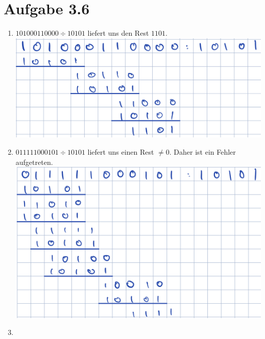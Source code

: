\documentclass[12pt, a4paper]{article}
\begin{document}
\newpage

\section*{Aufgabe 3.6}
\begin{enumerate}[label=\alph*)]
	\item	$101000110000 \div 10101$ liefert uns den Rest $1101$.\\
			\includegraphics[scale=0.6]{3.6_a.png}
	
	\item	$011111000101 \div 10101$ liefert uns einen Rest $\neq 0$. Daher ist ein Fehler aufgetreten.\\
			\includegraphics[scale=0.6]{3.6_b.png}
	
	\item	
\end{enumerate}
\end{document}
